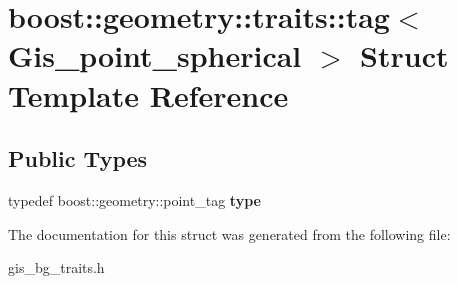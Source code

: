 \hypertarget{structboost_1_1geometry_1_1traits_1_1tag_3_01Gis__point__spherical_01_4}{}\section{boost\+:\+:geometry\+:\+:traits\+:\+:tag$<$ Gis\+\_\+point\+\_\+spherical $>$ Struct Template Reference}
\label{structboost_1_1geometry_1_1traits_1_1tag_3_01Gis__point__spherical_01_4}
\subsection*{Public Types}
\begin{DoxyCompactItemize}
\item 
\mbox{\label{structboost_1_1geometry_1_1traits_1_1tag_3_01Gis__point__spherical_01_4_a426e4e0f550180fbce2b48708dd95069}} 
typedef boost\+::geometry\+::point\+\_\+tag {\bfseries type}
\end{DoxyCompactItemize}


The documentation for this struct was generated from the following file\+:\begin{DoxyCompactItemize}
\item 
gis\+\_\+bg\+\_\+traits.\+h\end{DoxyCompactItemize}

